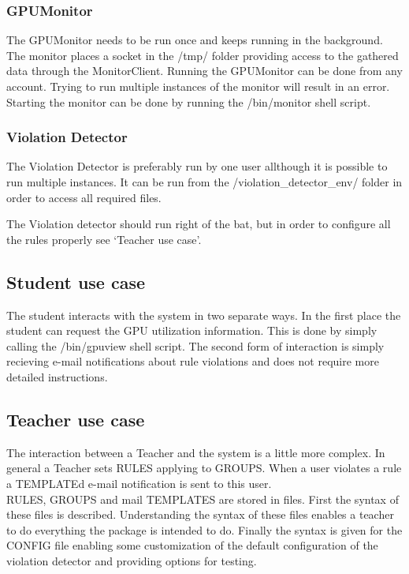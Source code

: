 \documentclass[10pt]{article}
\begin{document}
\subsubsection{GPUMonitor}
The GPUMonitor needs to be run once and keeps running in the background.
The monitor places a socket in the /tmp/ folder providing access to the
gathered data through the MonitorClient. Running the GPUMonitor can be 
done from any account. Trying to run multiple instances of the monitor 
will result in an error. Starting the monitor can be done by running the
/bin/monitor shell script.

\subsubsection{Violation Detector}
The Violation Detector is preferably run by one user allthough it is 
possible to run multiple instances. It can be run from the 
/violation\_detector\_env/ folder in order to access all required files.

The Violation detector should run right of the bat, but in order
to configure all the rules properly see `Teacher use case'.
    
\subsection{Student use case}
        The student interacts with the system in two separate ways. In the
        first place the student can request the GPU utilization information.
        This is done by simply calling the /bin/gpuview shell script.
        The second form of interaction is simply recieving e-mail notifications
        about rule violations and does not require more detailed instructions. 

\subsection{Teacher use case}
The interaction between a Teacher and the system is a little more
complex. In general a Teacher sets RULES applying to GROUPS. When
a user violates a rule a TEMPLATEd e-mail notification is sent to 
this user. \\

RULES, GROUPS and mail TEMPLATES are stored in files. First the syntax of these files is described. Understanding the syntax of these files enables a teacher to do everything the package is intended to do. Finally the syntax is given for the CONFIG file enabling some customization of the default configuration of the violation detector and providing options for testing. 
\end{document}
